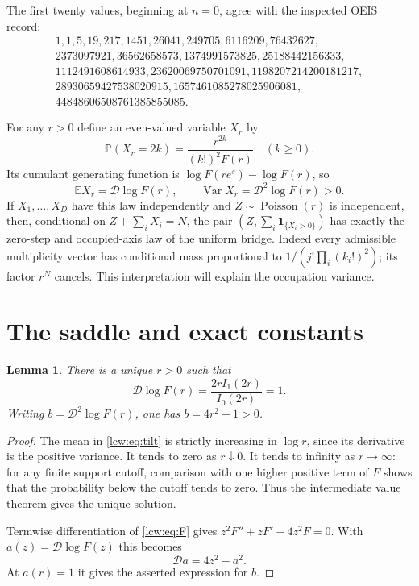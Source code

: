 \documentclass[11pt,letterpaper]{article}
\newtheorem{lemma}[theorem]{Lemma}
\theoremstyle{remark}\newtheorem{remark}[theorem]{Remark}
\newcommand{\E}{\mathbb E}\newcommand{\Pp}{\mathbb P}
\newcommand{\Var}{\operatorname{Var}}\newcommand{\Cov}{\operatorname{Cov}}
\newcommand{\Poi}{\operatorname{Poisson}}\newcommand{\Normal}{\mathcal N}
\newcommand{\one}{\mathbf 1}\newcommand{\DD}{\mathcal D}
\begin{document}
The first twenty values, beginning at $n=0$, agree with the inspected OEIS record:
\[
\begin{gathered}
1,1,5,19,217,1451,26041,249705,6116209,76432627,\\
2373097921,36562658573,1374991573825,25188442156333,\\
1112491608614933,23620069750701091,1198207214200181217,\\
28930659427538020915,1657461085278025906081,\\
44848606508761385855085.
\end{gathered}
\]

For any $r>0$ define an even-valued variable $X_r$ by
\begin{equation}\label{lcw:eq:tilt}
 \Pp(X_r=2k)=\frac{r^{2k}}{(k!)^2F(r)}\quad(k\ge0).
\end{equation}
Its cumulant generating function is $\log F(re^s)-\log F(r)$, so
\[
 \E X_r=\DD\log F(r),\qquad
 \Var X_r=\DD^2\log F(r)>0.
\]
If $X_1,\ldots,X_D$ have this law independently and $Z\sim\Poi(r)$ is independent, then, conditional on $Z+\sum_iX_i=N$, the pair
$(Z,\sum_i\one_{\{X_i>0\}})$ has exactly the zero-step and occupied-axis law of the uniform bridge. Indeed every admissible multiplicity vector has conditional mass proportional to $1/(j!\prod_i(k_i!)^2)$; its factor $r^N$ cancels. This interpretation will explain the occupation variance.

\section{The saddle and exact constants}\label{lcw:sec:constants}
\begin{lemma}\label{lcw:lem:saddle}
There is a unique $r>0$ such that
\begin{equation}\label{lcw:eq:saddle}
 \DD\log F(r)=\frac{2rI_1(2r)}{I_0(2r)}=1.
\end{equation}
Writing $b=\DD^2\log F(r)$, one has $b=4r^2-1>0$.
\end{lemma}
\begin{proof}
The mean in \eqref{lcw:eq:tilt} is strictly increasing in $\log r$, since its derivative is the positive variance. It tends to zero as $r\downarrow0$. It tends to infinity as $r\to\infty$: for any finite support cutoff, comparison with one higher positive term of $F$ shows that the probability below the cutoff tends to zero. Thus the intermediate value theorem gives the unique solution.

Termwise differentiation of \eqref{lcw:eq:F} gives
$z^2F''+zF'-4z^2F=0$. With $a(z)=\DD\log F(z)$ this becomes
\begin{equation}\label{lcw:eq:riccati}
 \DD a=4z^2-a^2.
\end{equation}
At $a(r)=1$ it gives the asserted expression for $b$.
\end{proof}
\end{document}
